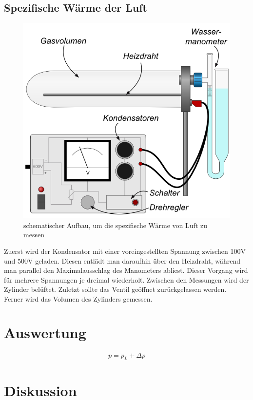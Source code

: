 \documentclass[12pt,a4paper,titlepage,headinclude,bibtotoc]{scrartcl}
\begin{document}
\subsection{Spezifische Wärme der Luft}
\begin{figure}[!htb]
 \centering
 \includegraphics[scale=0.7]{SpezWaermeSkizze.jpg}
 \caption{schematischer Aufbau, um die spezifische Wärme von Luft zu messen \cite{lp}}
 \label{fig:SWLSkizze}
\end{figure}
Zuerst wird der Kondensator mit einer voreingestellten Spannung zwischen 100V und 500V geladen.
Diesen entlädt man daraufhin über den Heizdraht, während man parallel den Maximalausschlag des Manometers abliest.
Dieser Vorgang wird für mehrere Spannungen je dreimal wiederholt.
Zwischen den Messungen wird der Zylinder belüftet.
Zuletzt sollte das Ventil geöffnet zurückgelassen werden.\\
Ferner wird das Volumen des Zylinders gemessen.

\section{Auswertung}
\label{sec:auswertung}
\begin{align}
	p=p_L+\Delta p
\end{align}

\section{Diskussion}
\label{sec:diskussion}
\end{document}
